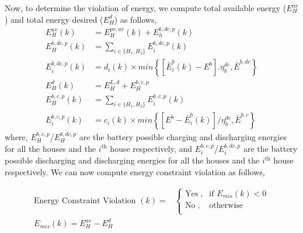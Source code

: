 \documentclass[11pt,usenames]{article}
\begin{document}
Now, to determine the violation of energy, we compute total available energy ($E_{H}^{av}$) and total energy desired ($E_{H}^{d}$) as follows,
\begin{align}	
	E_{H}^{av}(k) &= E_{H}^{pv,av}(k)+E_{h}^{b,dc,p}(k)\\
	E_{H}^{b,dc,p}(k) &= \sum_{i \in \{H_{1},H_{2}\}} E_{i}^{b,dc,p}(k)\\
	E_{i}^{b,dc,p}(k) &= d_{i}(k) \times min\left\lbrace \left[ \bar  E_{i}^{b}(k)-E^{b}\right].\eta_{b}^{dc}, \bar E^{b,dc} \right\rbrace  \\
	E_{H}^{d}(k) &= E_{H}^{L,d}+E_{H}^{b,c,p}\\
	E_{H}^{b,c,p}(k) &= \sum_{i \in \{H_{1},H_{2}\}} E_{i}^{b,c,p}(k)\\
	E_{i}^{b,c,p}(k) &= c_{i}(k) \times min\left\lbrace \left[E^{b}- \bar  E_{i}^{b}(k)\right]/\eta_{b}^{dc}, \bar E^{b,c} \right\rbrace 
\end{align}
where, $E_{H}^{b,c,p}$/$E_{H}^{b,dc,p}$ are the battery possible charging and discharging energies for all the houses and the $i^{\text{th}}$ house respectively, and $E_{i}^{b,c,p}$/$E_{i}^{b,dc,p}$ are the battery possible discharging and discharging energies for all the houses and the $i^{\text{th}}$ house respectively. We can now compute energy constraint violation as follows,

\begin{align}
	\text{Energy Constraint Violation }(k)= & 
	\begin{cases}
		\text{Yes} \; , & \text{if } E_{mis}(k)<0  \\
		\text{No} \; , & \text{otherwise} \\
	\end{cases}\\
	E_{mis}(k)=E_{H}^{av}-E_{H}^{d}
\end{align}
\end{document}
